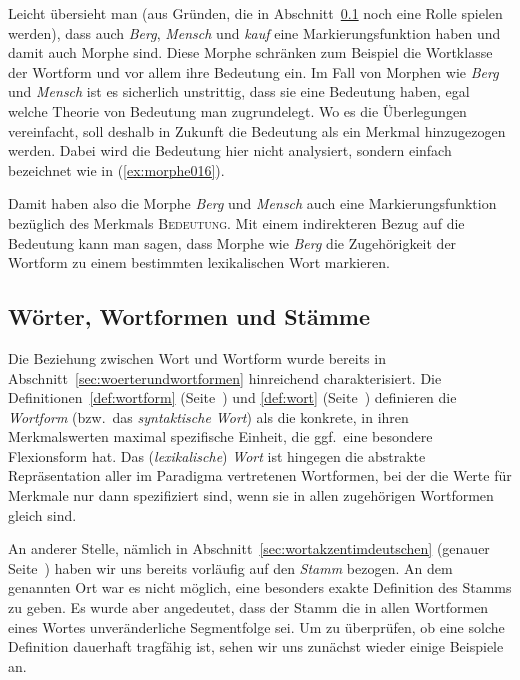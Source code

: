 Leicht übersieht man (aus Gründen, die in Abschnitt~\ref{sec:woerterwortformenundstaemme} noch eine Rolle spielen werden), dass auch \textit{Berg}, \textit{Mensch} und \textit{kauf} eine Markierungsfunktion haben und damit auch Morphe sind.
Diese Morphe schränken zum Beispiel die Wortklasse der Wortform und vor allem ihre Bedeutung ein.
Im Fall von Morphen wie \textit{Berg} und \textit{Mensch} ist es sicherlich unstrittig, dass sie eine Bedeutung haben, egal welche Theorie von Bedeutung man zugrundelegt.
Wo es die Überlegungen vereinfacht, soll deshalb in Zukunft die Bedeutung als ein Merkmal hinzugezogen werden.
Dabei wird die Bedeutung hier nicht analysiert, sondern einfach bezeichnet wie in (\ref{ex:morphe016}).

\begin{exe}
  \ex\label{ex:morphe016}
  \begin{xlist}
  \end{xlist}
\end{exe}

Damit haben also die Morphe \textit{Berg} und \textit{Mensch} auch eine Markierungsfunktion bezüglich des Merkmals \textsc{Bedeutung}.
Mit einem indirekteren Bezug auf die Bedeutung kann man sagen, dass Morphe wie \textit{Berg} die Zugehörigkeit der Wortform zu einem bestimmten lexikalischen Wort markieren.

\subsection{Wörter, Wortformen und Stämme}
\label{sec:woerterwortformenundstaemme}


Die Beziehung zwischen Wort und Wortform wurde bereits in Abschnitt~\ref{sec:woerterundwortformen} hinreichend charakterisiert.
Die Definitionen~\ref{def:wortform} (Seite~\pageref{def:wortform}) und \ref{def:wort} (Seite~\pageref{def:wort}) definieren die \textit{Wortform} (bzw.\ das \textit{syntaktische Wort}) als die konkrete, in ihren Merkmalswerten maximal spezifische Einheit, die ggf.\ eine besondere Flexionsform hat.
Das (\textit{lexikalische}) \textit{Wort} ist hingegen die abstrakte Repräsentation aller im Paradigma vertretenen Wortformen, bei der die Werte für Merkmale nur dann spezifiziert sind, wenn sie in allen zugehörigen Wortformen gleich sind.

An anderer Stelle, nämlich in Abschnitt~\ref{sec:wortakzentimdeutschen} (genauer Seite~\pageref{abs:wortakzentimdeutschen170}) haben wir uns bereits vorläufig auf den \textit{Stamm} bezogen.
An dem genannten Ort war es nicht möglich, eine besonders exakte Definition des Stamms zu geben.
Es wurde aber angedeutet, dass der Stamm die in allen Wortformen eines Wortes unveränderliche Segmentfolge sei.
Um zu überprüfen, ob eine solche Definition dauerhaft tragfähig ist, sehen wir uns zunächst wieder einige Beispiele an.

